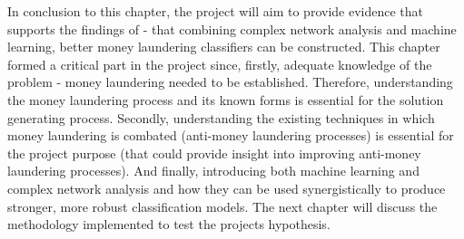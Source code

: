 In conclusion to this chapter, the project will aim to provide evidence that supports the findings of \citet{zanin2016combining} - that combining complex network analysis and machine learning, better money laundering classifiers can be constructed. This chapter formed a critical part in the project since, firstly, adequate knowledge of the problem - money laundering needed to be established. Therefore, understanding the money laundering process and its known forms is essential for the solution generating process. Secondly, understanding the existing techniques in which money laundering is combated (anti-money laundering processes) is essential for the project purpose (that could provide insight into improving anti-money laundering processes). And finally, introducing both machine learning and complex network analysis and how they can be used synergistically to produce stronger, more robust classification models. The next chapter will discuss the methodology implemented to test the projects hypothesis.     


